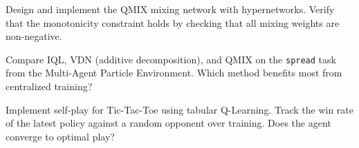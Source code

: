 \begin{exercise}
Design and implement the QMIX mixing network with hypernetworks.
Verify that the monotonicity constraint holds by checking that all
mixing weights are non-negative.
\end{exercise}

\begin{exercise}
Compare IQL, VDN (additive decomposition), and QMIX on the
\texttt{spread} task from the Multi-Agent Particle Environment.
Which method benefits most from centralized training?
\end{exercise}

\begin{exercise}
Implement self-play for Tic-Tac-Toe using tabular Q-Learning.
Track the win rate of the latest policy against a random opponent
over training. Does the agent converge to optimal play?
\end{exercise}
